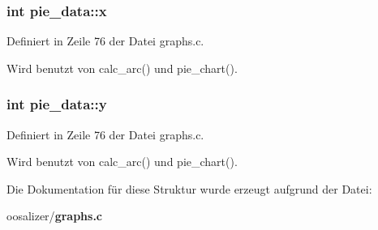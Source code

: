 \subsubsection{\setlength{\rightskip}{0pt plus 5cm}int {\bf pie\_\-data::x}}\label{structpie__data_eaf30870c955a292a0b2896b09bc4169}




Definiert in Zeile 76 der Datei graphs.c.

Wird benutzt von calc\_\-arc() und pie\_\-chart().
\subsubsection{\setlength{\rightskip}{0pt plus 5cm}int {\bf pie\_\-data::y}}\label{structpie__data_016eb86e9e554387895e400c2b285b7d}




Definiert in Zeile 76 der Datei graphs.c.

Wird benutzt von calc\_\-arc() und pie\_\-chart().

Die Dokumentation f\"{u}r diese Struktur wurde erzeugt aufgrund der Datei:\begin{CompactItemize}
\item 
oosalizer/{\bf graphs.c}\end{CompactItemize}
